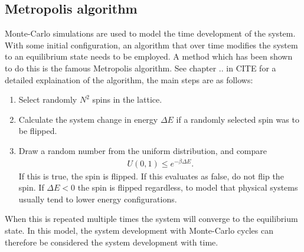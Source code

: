 \documentclass[aps,reprint]{revtex4-1}
\begin{document}
\subsection{Metropolis algorithm} \label{sec:theory_metro}
Monte-Carlo simulations are used to model the time development of the system.
With some initial configuration, an algorithm that over time modifies the system
to an equilibrium state needs to be employed. A method which has been shown to
do this is the famous Metropolis algorithm. See chapter .. in CITE for a detailed explaination
of the algorithm, the main steps are as follows:
\begin{enumerate}
  \item Select randomly $N^2$ spins in the lattice.
  \item Calculate the system change in energy $\Delta E$ if a randomly selected spin was to
  be flipped.
  \item Draw a random number from the uniform distribution, and compare
  \begin{align*}
    U(0,1) \leq e^{-\beta \Delta E}.
  \end{align*}
  If this is true, the spin is flipped. If this evaluates as false, do not flip
  the spin. If $\Delta E < 0$ the spin is flipped regardless, to model that physical
  systems usually tend to lower energy configurations.
\end{enumerate}
When this is repeated multiple times the system will converge to the equilibrium
state. In this model, the system development with Monte-Carlo cycles can therefore be
considered the system development with time.
\end{document}
